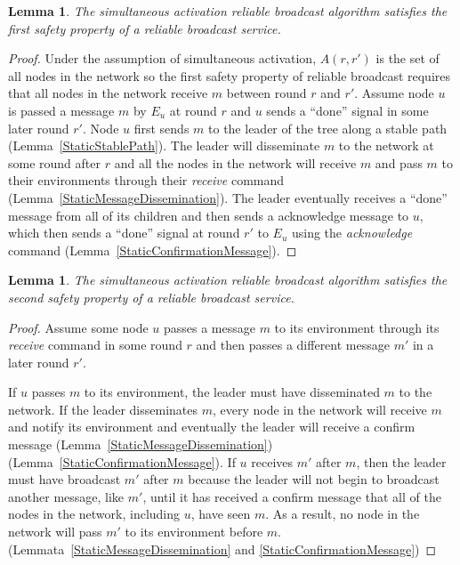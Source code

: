 \documentclass[english]{article}
\newtheorem{lemma}[theorem]{Lemma}
\begin{document}
\begin{lemma}
\label{StaticRBSafety1}
The simultaneous activation reliable broadcast algorithm satisfies the first safety property of a reliable broadcast service.
\end{lemma}
\begin{proof}

Under the assumption of simultaneous activation, $A(r,r')$ is the set of all nodes in the network so the first safety property of reliable broadcast requires that all nodes in the network receive $m$ between round $r$ and $r'$. Assume node $u$ is passed a message $m$ by $E_u$ at round $r$ and $u$ sends  a ``done'' signal in some later round $r'$. Node $u$ first sends $m$ to the leader of the tree along a stable path (Lemma~\ref{StaticStablePath}). The leader will disseminate $m$ to the network at some round after $r$ and all the nodes in the network will receive $m$ and pass $m$ to their environments through their \textit{receive} command (Lemma~\ref{StaticMessageDissemination}). The leader eventually receives a ``done'' message from all of its children and then sends a acknowledge message to $u$, which then sends  a ``done'' signal at round $r'$ to $E_u$ using the \textit{acknowledge} command (Lemma~\ref{StaticConfirmationMessage}). 

\end{proof}


\begin{lemma}
\label{StaticRBSafety2}
The simultaneous activation reliable broadcast algorithm satisfies the second safety property of a reliable broadcast service.
\end{lemma}
\begin{proof}

Assume some node $u$ passes a message $m$ to its environment through its \textit{receive} command in some round $r$ and then passes a different message $m'$ in a later round $r'$. 

If $u$ passes $m$ to its environment, the leader must have disseminated $m$ to the network. If the leader disseminates $m$, every node in the network will receive $m$ and notify its environment and eventually the leader will receive a confirm message (Lemma~\ref{StaticMessageDissemination}) (Lemma~\ref{StaticConfirmationMessage}). If $u$ receives $m'$ after $m$, then the leader must have broadcast $m'$ after $m$ because the leader will not begin to broadcast another message, like $m'$, until it has received a confirm message that all of the nodes in the network, including $u$, have seen $m$. As a result, no node in the network will pass $m'$ to its environment before $m$. (Lemmata~\ref{StaticMessageDissemination} and \ref{StaticConfirmationMessage})

\end{proof}
\end{document}
